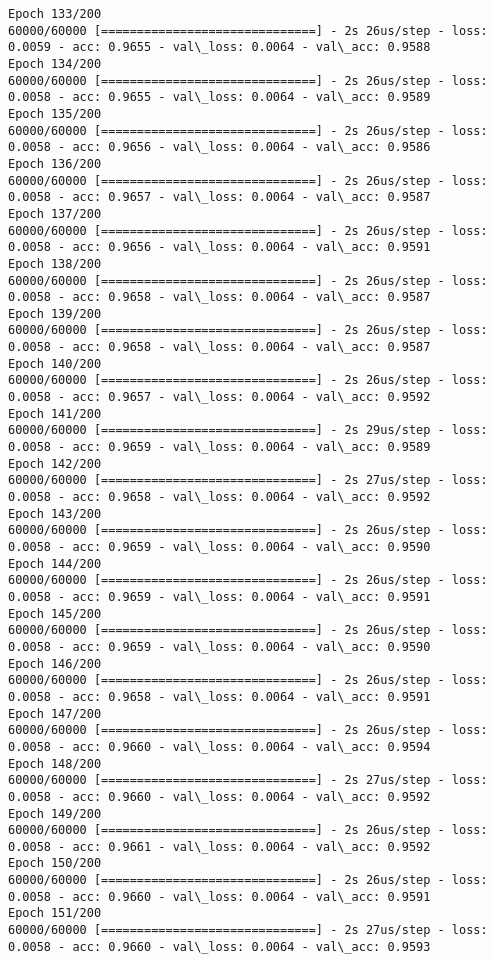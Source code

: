 \documentclass[11pt]{article}
\begin{document}
\begin{Verbatim}[commandchars=\\\{\}]
Epoch 133/200
60000/60000 [==============================] - 2s 26us/step - loss: 0.0059 - acc: 0.9655 - val\_loss: 0.0064 - val\_acc: 0.9588
Epoch 134/200
60000/60000 [==============================] - 2s 26us/step - loss: 0.0058 - acc: 0.9655 - val\_loss: 0.0064 - val\_acc: 0.9589
Epoch 135/200
60000/60000 [==============================] - 2s 26us/step - loss: 0.0058 - acc: 0.9656 - val\_loss: 0.0064 - val\_acc: 0.9586
Epoch 136/200
60000/60000 [==============================] - 2s 26us/step - loss: 0.0058 - acc: 0.9657 - val\_loss: 0.0064 - val\_acc: 0.9587
Epoch 137/200
60000/60000 [==============================] - 2s 26us/step - loss: 0.0058 - acc: 0.9656 - val\_loss: 0.0064 - val\_acc: 0.9591
Epoch 138/200
60000/60000 [==============================] - 2s 26us/step - loss: 0.0058 - acc: 0.9658 - val\_loss: 0.0064 - val\_acc: 0.9587
Epoch 139/200
60000/60000 [==============================] - 2s 26us/step - loss: 0.0058 - acc: 0.9658 - val\_loss: 0.0064 - val\_acc: 0.9587
Epoch 140/200
60000/60000 [==============================] - 2s 26us/step - loss: 0.0058 - acc: 0.9657 - val\_loss: 0.0064 - val\_acc: 0.9592
Epoch 141/200
60000/60000 [==============================] - 2s 29us/step - loss: 0.0058 - acc: 0.9659 - val\_loss: 0.0064 - val\_acc: 0.9589
Epoch 142/200
60000/60000 [==============================] - 2s 27us/step - loss: 0.0058 - acc: 0.9658 - val\_loss: 0.0064 - val\_acc: 0.9592
Epoch 143/200
60000/60000 [==============================] - 2s 26us/step - loss: 0.0058 - acc: 0.9659 - val\_loss: 0.0064 - val\_acc: 0.9590
Epoch 144/200
60000/60000 [==============================] - 2s 26us/step - loss: 0.0058 - acc: 0.9659 - val\_loss: 0.0064 - val\_acc: 0.9591
Epoch 145/200
60000/60000 [==============================] - 2s 26us/step - loss: 0.0058 - acc: 0.9659 - val\_loss: 0.0064 - val\_acc: 0.9590
Epoch 146/200
60000/60000 [==============================] - 2s 26us/step - loss: 0.0058 - acc: 0.9658 - val\_loss: 0.0064 - val\_acc: 0.9591
Epoch 147/200
60000/60000 [==============================] - 2s 26us/step - loss: 0.0058 - acc: 0.9660 - val\_loss: 0.0064 - val\_acc: 0.9594
Epoch 148/200
60000/60000 [==============================] - 2s 27us/step - loss: 0.0058 - acc: 0.9660 - val\_loss: 0.0064 - val\_acc: 0.9592
Epoch 149/200
60000/60000 [==============================] - 2s 26us/step - loss: 0.0058 - acc: 0.9661 - val\_loss: 0.0064 - val\_acc: 0.9592
Epoch 150/200
60000/60000 [==============================] - 2s 26us/step - loss: 0.0058 - acc: 0.9660 - val\_loss: 0.0064 - val\_acc: 0.9591
Epoch 151/200
60000/60000 [==============================] - 2s 27us/step - loss: 0.0058 - acc: 0.9660 - val\_loss: 0.0064 - val\_acc: 0.9593

\end{Verbatim}
\end{document}
